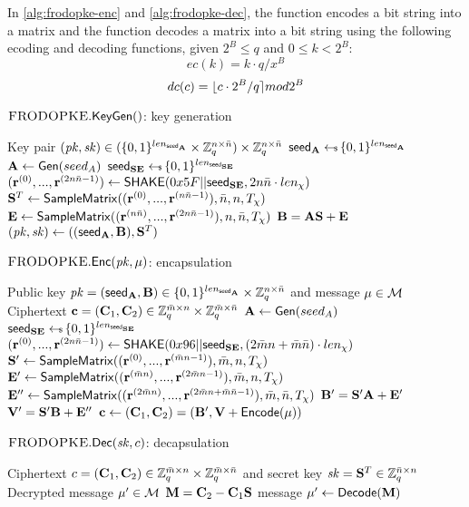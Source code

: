 In \ref{alg:frodopke-enc} and \ref{alg:frodopke-dec}, the \Encode function encodes a bit string into a matrix 
and the \Decode function decodes a matrix into a bit string using the following ecoding and decoding functions, 
given $2^B \leq q$ and $0 \leq k < 2^B$:
\[ec(k) = k \cdot q/x^B\]
\[dc(c) = \lfloor c \cdot 2^B/q\rceil mod 2^B \]

\begin{algorithm}[tb]
  \caption{$\textsc{FRODOPKE}.\mathsf{KeyGen}()$: key generation}
  \label{alg:frodopke-gen}
  \begin{algorithmic}[1]
      \Ensure Key pair $(\mathit{pk}, \mathit{sk}) \in (\{0, 1\}^{len_{\mathsf{seed}_{\mathbf{A}}}} \times \mathbb{Z}_q^{n \times \bar{n}}) \times \mathbb{Z}_q^{n \times \bar{n}}$
    \State $\mathsf{seed}_{\mathbf{A}} \leftarrow \!\!\! \mbox{\tiny \$}\, \{0, 1\}^{len_{\mathsf{seed}_{\mathbf{A}}}}$
    \State $\mathbf{A} \gets \mathsf{Gen}(seed_A)$
    \State $\mathsf{seed}_\mathbf{SE} \leftarrow \!\!\! \mbox{\tiny \$}\, \{0, 1\}^{len_{\mathsf{seed}_\mathbf{SE}}}$
    \State $(\mathbf{r}^{(0)}, ..., \mathbf{r}^{(2n\bar{n}-1)}) \gets \text{{\sf SHAKE}}(0x5F||\mathsf{seed}_\mathbf{SE}, 2n\bar{n}\cdot len_\chi)$
    \State $\mathbf{S}^T \gets \mathsf{SampleMatrix}((\mathbf{r}^{(0)}, ..., \mathbf{r}^{(n\bar{n}-1)}), \bar{n}, n, T_{\chi})$
    \State $\mathbf{E} \gets \mathsf{SampleMatrix}((\mathbf{r}^{(n\bar{n})}, ..., \mathbf{r}^{(2n\bar{n}-1)}), n, \bar{n}, T_{\chi})$
    \State $\mathbf{B} = \mathbf{A} \mathbf{S} + \mathbf{E}$
    \State \Return $(\mathit{pk}, \mathit{sk}) \gets ((\mathsf{seed}_{\mathbf{A}}, \mathbf{B}), \mathbf{S}^T)$
  \end{algorithmic}
\end{algorithm}

\begin{algorithm}[tb]
  \caption{$\textsc{FRODOPKE}.\mathsf{Enc}(\mathit{pk}, \mu)$: encapsulation}
  \label{alg:frodopke-enc}
  \begin{algorithmic}[1]
    \Require Public key $\mathit{pk} = (\mathsf{seed}_{\mathbf{A}}, \mathbf{B}) \in \{0, 1\}^{len_{\mathsf{seed}_{\mathbf{A}}}} \times \mathbb{Z}_q^{n \times \bar{n}}$ and message $\mu \in \mathcal{M}$
    \Ensure Ciphertext $\mathbf{c} = (\mathbf{C}_1, \mathbf{C}_2) \in \mathbb{Z}_q^{\bar{m} \times n} \times \mathbb{Z}_q^{\bar{m} \times \bar{n}}$
    \State $\mathbf{A} \gets \mathsf{Gen}(seed_A)$
    \State $\mathsf{seed}_\mathbf{SE} \leftarrow \!\!\! \mbox{\tiny \$}\, \{0,1\}^{len_{\mathsf{seed}_\mathbf{SE}}}$
      \State $(\mathbf{r}^{(0)}, ..., \mathbf{r}^{(2n\bar{n}-1)}) \gets \text{{\sf SHAKE}}(0x96||\mathsf{seed}_\mathbf{SE}, (2\bar{m}n+\bar{m}\bar{n})\cdot len_\chi)$
    \State $\mathbf{S}' \gets \mathsf{SampleMatrix}((\mathbf{r}^{(0)}, ..., \mathbf{r}^{(\bar{m}n-1)}), \bar{m}, n, T_{\chi})$
    \State $\mathbf{E}' \gets \mathsf{SampleMatrix}((\mathbf{r}^{(\bar{m}n)}, ..., \mathbf{r}^{(2\bar{m}n-1)}), \bar{m}, n, T_{\chi})$
    \State $\mathbf{E}'' \gets \mathsf{SampleMatrix}((\mathbf{r}^{(2\bar{m}n)}, ..., \mathbf{r}^{(2\bar{m}n+\bar{m}\bar{n}-1)}), \bar{m}, \bar{n}, T_{\chi})$
    \State $\mathbf{B}' = \mathbf{S}'\mathbf{A} + \mathbf{E}'$
    \State $\mathbf{V}' = \mathbf{S}'\mathbf{B} + \mathbf{E}''$
    \State \Return $\mathbf{c} \gets (\mathbf{C}_1, \mathbf{C}_2) = (\mathbf{B}', \mathbf{V} + \mathsf{Encode}(\mu))$
  \end{algorithmic}
\end{algorithm}

\begin{algorithm}[tb]
  \caption{$\textsc{FRODOPKE}.\mathsf{Dec}(\mathit{sk}, c)$: decapsulation}
  \label{alg:frodopke-dec}
  \begin{algorithmic}[1]
      \Require Ciphertext $c = (\mathbf{C}_1, \mathbf{C}_2) \in \mathbb{Z}_q^{\bar{m} \times n} \times \mathbb{Z}_q^{\bar{m} \times \bar{n}}$ and secret key $\mathit{sk} = \mathbf{S}^T \in \mathbb{Z}_q^{\bar{n} \times n}$
    \Ensure Decrypted message $\mu' \in \mathcal{M}$
    \State $\mathbf{M} = \mathbf{C}_2 - \mathbf{C}_1\mathbf{S}$
    \State \Return message $\mu' \gets \mathsf{Decode}(\mathbf{M})$
  \end{algorithmic}
\end{algorithm}
